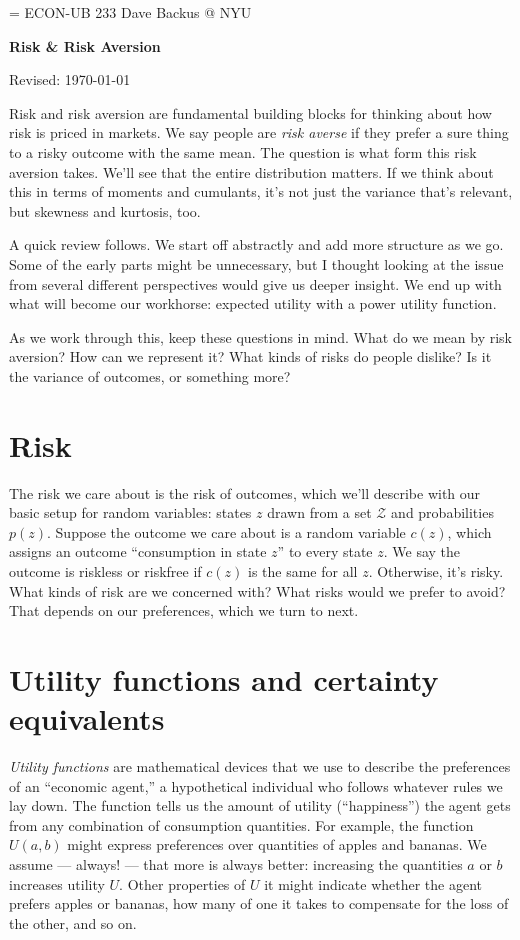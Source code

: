 \documentclass[11pt]{article}
\begin{document}
\parskip=\bigskipamount
\parindent=0.0in
\thispagestyle{empty}
{\large ECON-UB 233 \hfill Dave Backus @ NYU}

\bigskip\bigskip
\centerline{\Large \bf Risk \& Risk Aversion}
\centerline{Revised: \today}

\medskip
Risk and risk aversion are fundamental building blocks
for thinking about how risk is priced in markets.
We say people are {\it risk averse\/} if they
prefer a sure thing to a risky outcome with the same mean.
The question is what form this risk aversion takes.
We'll see that the entire distribution matters.
If we think about this in terms of moments and cumulants,
it's not just the variance that's relevant,
but skewness and kurtosis, too.

A quick review follows.
We start off abstractly and add more structure as we go.
Some of the early parts might be unnecessary,
but I thought looking at the issue from several different
perspectives would give us deeper insight.
We end up with what will become our workhorse:
expected utility with a power utility function.

As we work through this, keep these questions in mind.
What do we mean by risk aversion?
How can we represent it?
What kinds of risks do people dislike?
Is it the variance of outcomes, or something more?


\section{Risk}

The risk we care about is the risk of outcomes,
which we'll describe with our basic setup for random variables:
states $z$ drawn from a set $\mathcal{Z}$ and probabilities $p(z)$.
Suppose the outcome we care about is a random variable $c(z)$,
which assigns an outcome ``consumption in state $z$''
to every state $z$.
We say the outcome is riskless or riskfree if $c(z)$ is
the same for all $z$.
Otherwise, it's risky.
What kinds of risk are we concerned with?
What risks would we prefer to avoid?
That depends on our preferences, which we turn to next.


\section{Utility functions and certainty equivalents}

{\it Utility functions\/} are mathematical devices that we use
to describe the preferences of an ``economic agent,''
a hypothetical individual who follows whatever rules we lay down.
The function tells us the amount of utility (``happiness'')
the agent gets from any combination of consumption quantities.
For example, the function $U(a,b)$ might express preferences
over quantities of apples and bananas.
We assume --- always! --- that more is always better:
increasing the quantities $a$ or $b$ increases utility $U$.
Other properties of $U$ it might indicate
whether the agent prefers apples or bananas,
how many of one it takes to compensate for the loss of the other,
and so on.
\end{document}
